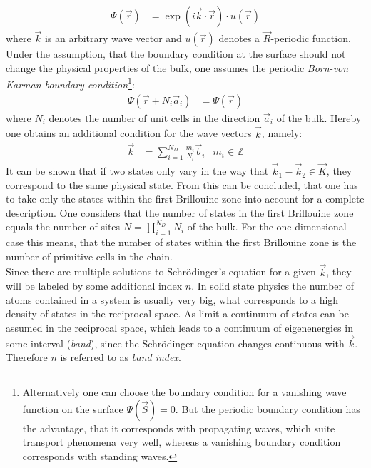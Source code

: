 \begin{align}
	\Psi(\vec{r}) &= \exp\left(i\vec{k}\cdot\vec{r}\right) \cdot u\left(\vec{r}\right)
\end{align}
where $\vec{k}$ is an arbitrary wave vector and $u\left(\vec{r}\right)$ denotes a $\vec{R}$-periodic function.\\
Under the assumption, that the boundary condition at the surface should not change the physical properties of the bulk, one assumes the periodic \emph{Born-von Karman boundary condition}\footnote{Alternatively one can choose the boundary condition  for a vanishing wave function on the surface $\Psi\left(\vec{S}\right) = 0$. But the periodic boundary condition has the advantage, that it corresponds with propagating waves, which suite transport phenomena very well, whereas a vanishing boundary condition corresponds with standing waves.}:
\begin{align}
	\Psi\left(\vec{r} + N_i \vec{a}_i\right) &= \Psi\left(\vec{r}\right)
\end{align}
where $N_i$ denotes the number of unit cells in the direction $\vec{a}_i$ of the bulk. Hereby one obtains an additional condition for the wave vectors $\vec{k}$, namely:
\begin{align}
	\vec{k} &= \sum_{i = 1}^{N_D} \frac{m_i}{N_i} \vec{b}_i & m_i \in \mathbb{Z} 
\end{align}
It can be shown that if two states only vary in the way that $\vec{k}_1 - \vec{k}_2 \in \vec{K}$, they correspond to the same physical state. From this can be concluded, that one has to take only the states within the first Brillouine zone into account for a complete description. One considers that the number of states in the first Brillouine zone equals the number of sites $N = \prod_{i = 1}^{N_D}N_i$ of the bulk. For the one dimensional case this means, that the number of states within the first Brillouine zone is the number of primitive cells in the chain.\\
Since there are multiple solutions to Schrödinger's equation for a given $\vec{k}$, they will be labeled by some additional index $n$. In solid state physics the number of atoms contained in a system is usually very big, what corresponds to a high density of states in the reciprocal space. As limit a continuum of states can be assumed in the reciprocal space, which leads to a continuum of eigenenergies in some interval (\emph{band}), since the Schrödinger equation changes continuous with $\vec{k}$. Therefore $n$ is referred to as \emph{band index}.

